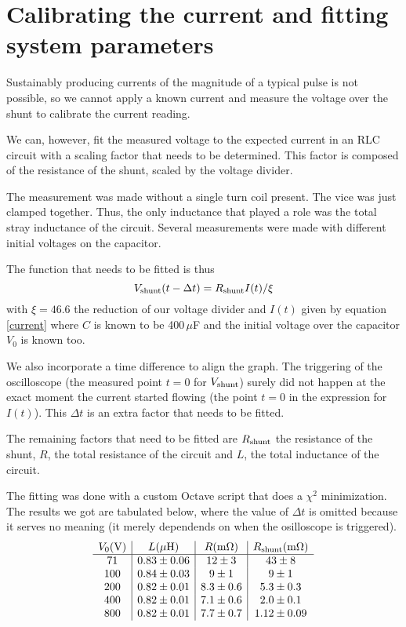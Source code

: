 
\section{Calibrating the current and fitting system parameters 
\label{secIcalib}}
Sustainably producing currents of the magnitude of a typical pulse is not 
possible, so we cannot apply a known current and measure the voltage over 
the shunt to calibrate the current reading.

We can, however, fit the measured voltage to the expected current in an RLC 
circuit with a scaling factor that needs to be determined. This factor is 
composed of the resistance of the shunt, scaled by the voltage divider. 

The measurement was made without a single turn coil present. The vice was 
just clamped together. Thus, the only inductance that played a role was the 
total stray inductance of the circuit. Several measurements were made with 
different initial voltages on the capacitor.

The function that needs to be fitted is thus
$$
V_\mathrm{shunt}(t - \Delta t) = R_\mathrm{shunt} I(t) / \xi
$$
with $\xi = 46.6$ the reduction of our voltage divider and $I(t)$ given by 
equation \ref{current} where $C$ is known to be 400\,$\mu$F and the initial 
voltage over the capacitor $V_0$ is known too.

We also incorporate a time difference to align the graph. The triggering of 
the oscilloscope (the measured point $t = 0$ for $V_\mathrm{shunt}$) surely did not 
happen at the exact moment the current started flowing (the point $t = 0$ 
in the expression for $I(t)$). This $\Delta t$ is an extra factor that 
needs to be fitted.

The remaining factors that need to be fitted are $R_\mathrm{shunt}$ the resistance 
of the shunt, $R$, the total resistance of the circuit and $L$, the total 
inductance of the circuit.

The fitting was done with a custom Octave script that does a $\chi^2$ 
minimization. The results we got are tabulated below, where the value of 
$\Delta t$ is omitted because it serves no meaning (it merely dependends on 
when the osilloscope is triggered).
$$
\begin{array}{c|c|c|c}
V_0 (\mathrm V)&
	L (\mu\mathrm H)&
			R (\mathrm m \Omega)&
				R_\mathrm{shunt} (\mathrm m \Omega)\\\hline
71&	0.83 \pm 0.06&	12 \pm 3&	43 \pm 8\\
100&	0.84 \pm 0.03&	9 \pm 1&	9 \pm 1\\
200&	0.82 \pm 0.01&	8.3 \pm 0.6&	5.3 \pm 0.3\\
400&	0.82 \pm 0.01&	7.1 \pm 0.6&	2.0 \pm 0.1\\
800&	0.82 \pm 0.01&	7.7 \pm 0.7&	1.12 \pm 0.09\\
\end{array}
$$

